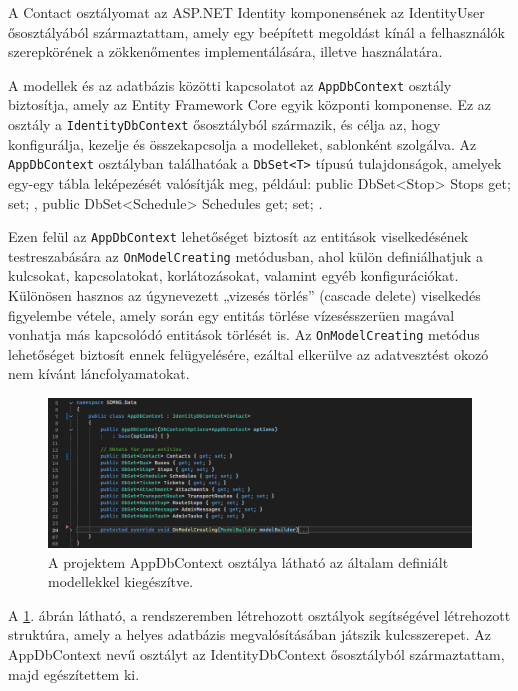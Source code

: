 A Contact osztályomat az ASP.NET Identity komponensének az IdentityUser ősosztályából származtattam, amely egy beépített megoldást kínál a felhasználók szerepkörének a zökkenőmentes implementálására, illetve használatára.

A modellek és az adatbázis közötti kapcsolatot az \texttt{AppDbContext} osztály biztosítja, amely az Entity Framework Core egyik központi komponense. Ez az osztály a \texttt{IdentityDbContext} ősosztályból származik, és célja az, hogy konfigurálja, kezelje és összekapcsolja a modelleket, sablonként szolgálva. Az \texttt{AppDbContext} osztályban találhatóak a \texttt{DbSet<T>} típusú tulajdonságok, amelyek egy-egy tábla leképezését valósítják meg, például: public DbSet<Stop> Stops { get; set; }, public DbSet<Schedule> Schedules { get; set; }.

Ezen felül az \texttt{AppDbContext} lehetőséget biztosít az entitások viselkedésének testreszabására az \texttt{OnModelCreating} metódusban, ahol külön definiálhatjuk a kulcsokat, kapcsolatokat, korlátozásokat, valamint egyéb konfigurációkat. Különösen hasznos az úgynevezett „vizesés törlés” (cascade delete) viselkedés figyelembe vétele, amely során egy entitás törlése vízesésszerüen magával vonhatja más kapcsolódó entitások törlését is. Az \texttt{OnModelCreating} metódus lehetőséget biztosít ennek felügyelésére, ezáltal elkerülve az adatvesztést okozó nem kívánt láncfolyamatokat.

\begin{figure}[H]
\centering
\includegraphics[width=1\textwidth]{Szakdolgozat/Mellekletek/AppDbContext.PNG}
\caption{A projektem AppDbContext osztálya látható az általam definiált modellekkel kiegészítve. }
\label{fig:appdbcontext}
\end{figure}

A \ref{fig:appdbcontext}. ábrán látható, a rendszeremben létrehozott osztályok segítségével létrehozott struktúra, amely a helyes adatbázis megvalósításában játszik kulcsszerepet. Az AppDbContext nevű osztályt az IdentityDbContext ősosztályból származtattam, majd egészítettem ki.
\vspace{\baselineskip}


